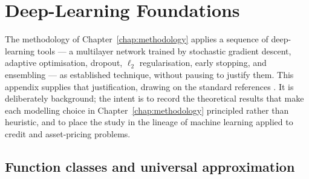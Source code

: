 %

\chapter{Deep-Learning Foundations}
\label{app:dlfoundations}

The methodology of Chapter~\ref{chap:methodology} applies a sequence of
deep-learning tools --- a multilayer network trained by stochastic
gradient descent, adaptive optimisation, dropout, $\ell_2$
regularisation, early stopping, and ensembling --- as established
technique, without pausing to justify them. This appendix supplies
that justification, drawing on the standard references
\citep{goodfellow2016,hastie2009}. It is deliberately background; the
intent is to record the theoretical results that make each modelling
choice in Chapter~\ref{chap:methodology} principled rather than
heuristic, and to place the study in the lineage of machine learning
applied to credit and asset-pricing problems.

\section{Function classes and universal approximation}
\label{sec:dlf-approx}

